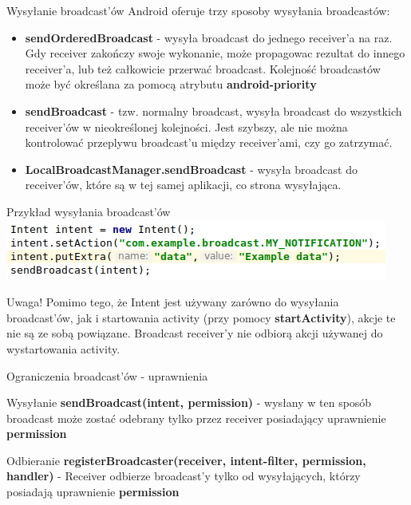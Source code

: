 \documentclass{beamer}
\begin{document}
\begin{frame}{Wysyłanie broadcast'ów}
	Android oferuje trzy sposoby wysyłania broadcastów:
	\begin{itemize}
		\item<1-> \textbf{sendOrderedBroadcast} - wysyła broadcast do jednego receiver'a na raz. Gdy receiver zakończy 	swoje wykonanie, może propagowac rezultat do innego receiver'a, lub też całkowicie przerwać broadcast.	Kolejność broadcastów może być określana za pomocą atrybutu \textbf{android-priority}
		\item<2-> \textbf{sendBroadcast} - tzw. normalny broadcast, wysyła broadcast do wszystkich receiver'ów w nieokreślonej kolejności. Jest szybszy, ale nie można kontrolować przeplywu broadcast'u między receiver'ami, czy go zatrzymać.
		\item<3-> \textbf{LocalBroadcastManager.sendBroadcast} - wysyła broadcast do receiver'ów, które są w tej samej aplikacji, co strona wysyłająca. 
	\end{itemize}
\end{frame}

\begin{frame}{Przykład wysyłania broadcast'ów}
	\centering
	\includegraphics[width=\textwidth]{send-broadcast}
	\begin{block}{Uwaga!}
		Pomimo tego, że Intent jest używany zarówno do wysyłania broadcast'ów, jak i startowania activity (przy pomocy \textbf{startActivity}), akcje te nie są ze sobą powiązane. Broadcast receiver'y nie odbiorą akcji używanej do wystartowania activity.
	\end{block}
\end{frame}

\begin{frame}{Ograniczenia broadcast'ów - uprawnienia}
	\begin{block}{Wysyłanie}
		\textbf{sendBroadcast(intent, permission)} - wysłany w ten sposób broadcast może zostać odebrany tylko przez receiver posiadający uprawnienie \textbf{permission} 
	\end{block}
	\begin{block}{Odbieranie}
		\textbf{registerBroadcaster(receiver, intent-filter, permission, handler)} - Receiver odbierze broadcast'y tylko od wysyłających, którzy posiadają uprawnienie \textbf{permission}
	\end{block}
\end{frame}
\end{document}
